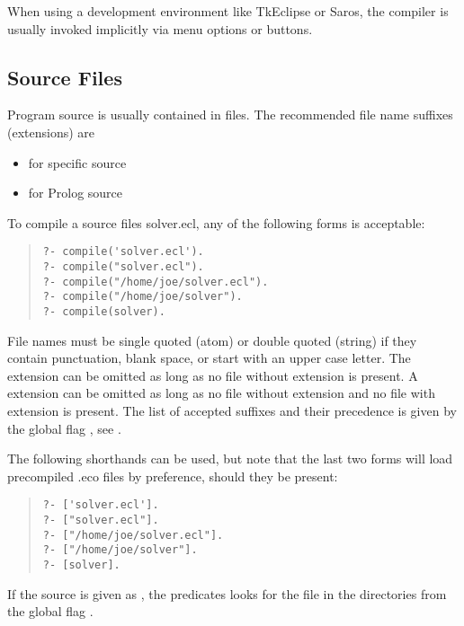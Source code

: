 When using a development environment like
TkEclipse or Saros, the compiler is usually invoked implicitly via
menu options or buttons.

\subsection{Source Files}

Program source is usually contained in files.  The recommended file name
%
suffixes (extensions) are
\begin{itemize}
\item {} for {\eclipse} specific source
\item {} for Prolog source
\end{itemize}
To compile a source files solver.ecl, any of the following forms is
acceptable:
\begin{quote}
\begin{verbatim}
?- compile('solver.ecl').
?- compile("solver.ecl").
?- compile("/home/joe/solver.ecl").
?- compile("/home/joe/solver").
?- compile(solver).
\end{verbatim}
\end{quote}
File names must be single quoted (atom) or double quoted (string)
if they contain punctuation, blank space, or start with an upper case letter.
The  extension can be omitted as long as no file without
extension
is present. A  extension can be omitted as long as no file without
extension and no file with  extension is present. The list of
accepted suffixes and their precedence is given by the global flag
, see
.

The following shorthands can be used, but note that the last two forms
will load precompiled .eco files by preference, should they be present:
\begin{quote}
\begin{verbatim}
?- ['solver.ecl'].
?- ["solver.ecl"].
?- ["/home/joe/solver.ecl"].
?- ["/home/joe/solver"].
?- [solver].
\end{verbatim}
\end{quote}

If the source is given as , the predicates
looks for the file
in the directories from the global flag .

